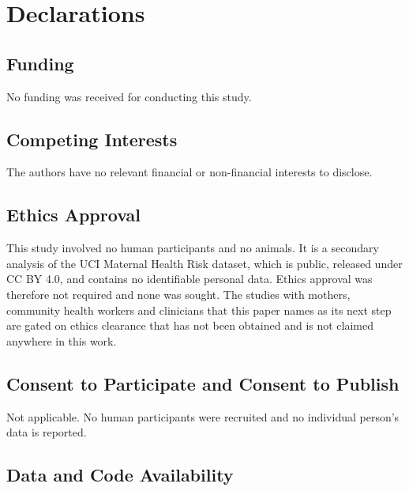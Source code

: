 
\section*{Declarations}

\subsection*{Funding}

No funding was received for conducting this study.

\subsection*{Competing Interests}

The authors have no relevant financial or non-financial interests to
disclose.

\subsection*{Ethics Approval}

This study involved no human participants and no animals. It is a secondary
analysis of the UCI Maternal Health Risk dataset, which is public, released
under CC BY 4.0, and contains no identifiable personal data. Ethics approval
was therefore not required and none was sought. The studies with mothers,
community health workers and clinicians that this paper names as its next
step are gated on ethics clearance that has not been obtained and is not
claimed anywhere in this work.

\subsection*{Consent to Participate and Consent to Publish}

Not applicable. No human participants were recruited and no individual
person's data is reported.

\subsection*{Data and Code Availability}

